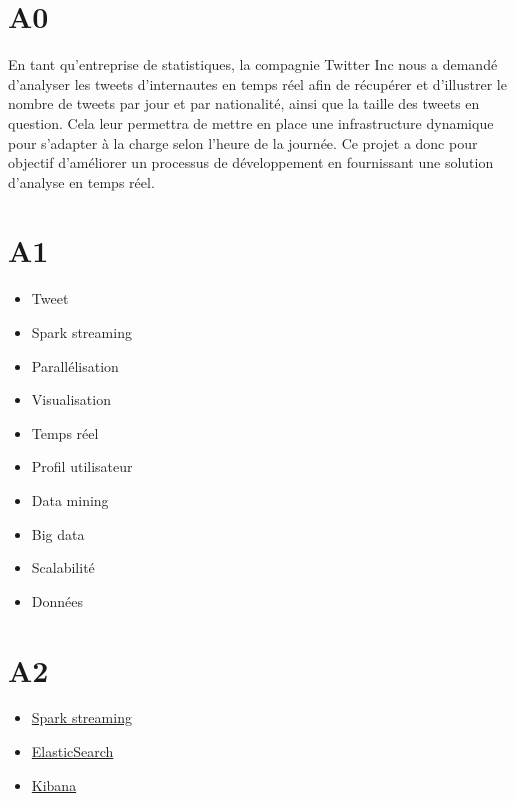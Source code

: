 \section{A0}
  En tant qu'entreprise de statistiques, la compagnie Twitter Inc nous a demandé d'analyser les tweets d'internautes en temps réel afin de récupérer et d'illustrer le nombre de tweets par jour et par nationalité, ainsi que la taille des tweets en question. Cela leur permettra de mettre en place une infrastructure dynamique pour s'adapter à la charge selon l'heure de la journée. Ce projet a donc pour objectif d'améliorer un processus de développement en fournissant une solution d'analyse en temps réel.

\section{A1}
  \begin{itemize}
    \item Tweet
    \item Spark streaming
    \item Parallélisation
    \item Visualisation
    \item Temps réel
    \item Profil utilisateur
    \item Data mining
    \item Big data
    \item Scalabilité
    \item Données
  \end{itemize}

\section{A2}
  \begin{itemize}
    \item \href{http://spark.apache.org/streaming/}{Spark streaming}
    \item \href{https://www.elastic.co/products/elasticsearch}{ElasticSearch}
    \item \href{https://www.elastic.co/products/kibana}{Kibana}
  \end{itemize}

